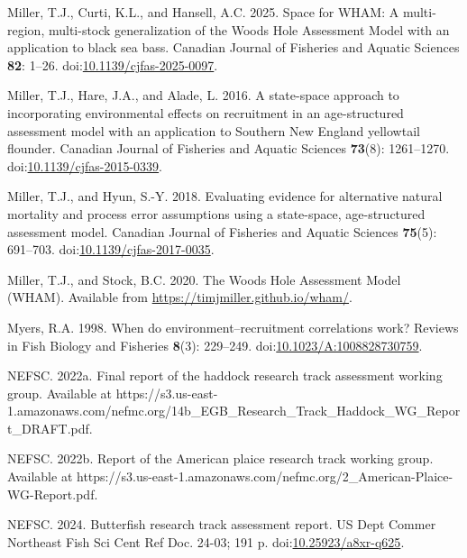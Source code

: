 \documentclass[
  12pt,
]{article}
\newlength{\cslhangindent}
\newenvironment{CSLReferences}[2] %
 {\begin{list}{}{%
  \setlength{\itemindent}{0pt}
  \setlength{\leftmargin}{0pt}
  \setlength{\parsep}{0pt}
  \ifodd #1
   \setlength{\leftmargin}{\cslhangindent}
   \setlength{\itemindent}{-1\cslhangindent}
  \fi
  \setlength{\itemsep}{#2\baselineskip}}}
 {\end{list}}
\begin{document}
\begin{CSLReferences}{1}{0}
Miller, T.J., Curti, K.L., and Hansell, A.C. 2025. Space for {WHAM}: A
multi-region, multi-stock generalization of the {W}oods {H}ole
{A}ssessment {M}odel with an application to black sea bass. Canadian
Journal of Fisheries and Aquatic Sciences \textbf{82}: 1--26.
doi:\href{https://doi.org/10.1139/cjfas-2025-0097}{10.1139/cjfas-2025-0097}.

Miller, T.J., Hare, J.A., and Alade, L. 2016. A state-space approach to
incorporating environmental effects on recruitment in an age-structured
assessment model with an application to {S}outhern {N}ew {E}ngland
yellowtail flounder. Canadian Journal of Fisheries and Aquatic Sciences
\textbf{73}(8): 1261--1270.
doi:\href{https://doi.org/10.1139/cjfas-2015-0339}{10.1139/cjfas-2015-0339}.

Miller, T.J., and Hyun, S.-Y. 2018. Evaluating evidence for alternative
natural mortality and process error assumptions using a state-space,
age-structured assessment model. Canadian Journal of Fisheries and
Aquatic Sciences \textbf{75}(5): 691--703.
doi:\href{https://doi.org/10.1139/cjfas-2017-0035}{10.1139/cjfas-2017-0035}.

Miller, T.J., and Stock, B.C. 2020. The {Woods Hole Assessment Model}
({WHAM}). Available from \url{https://timjmiller.github.io/wham/}.

Myers, R.A. 1998. When do environment--recruitment correlations work?
Reviews in Fish Biology and Fisheries \textbf{8}(3): 229--249.
doi:\href{https://doi.org/10.1023/A:1008828730759}{10.1023/A:1008828730759}.

NEFSC. 2022a. Final report of the haddock research track assessment
working group. {Available} at
https://s3.us-east-1.amazonaws.com/nefmc.org/14b\_EGB\_Research\_Track\_Haddock\_WG\_Report\_DRAFT.pdf.

NEFSC. 2022b. Report of the {A}merican plaice research track working
group. {Available} at
https://s3.us-east-1.amazonaws.com/nefmc.org/2\_American-Plaice-WG-Report.pdf.

NEFSC. 2024. Butterfish research track assessment report. US Dept Commer
Northeast Fish Sci Cent Ref Doc. 24-03; 191 p.
doi:\href{https://doi.org/10.25923/a8xr-q625}{10.25923/a8xr-q625}.


\end{CSLReferences}
\end{document}
